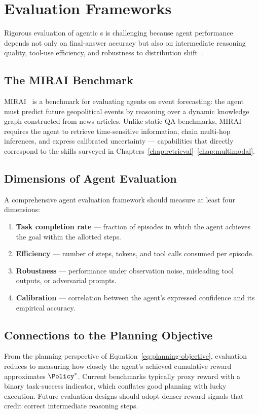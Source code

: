 \chapter{Evaluation Frameworks}
\label{chap:evaluation}

Rigorous evaluation of agentic \LLM{}s is challenging because agent
performance depends not only on final-answer accuracy but also on
intermediate reasoning quality, tool-use efficiency, and robustness to
distribution shift~\cite{ye2024mirai}.

\section{The MIRAI Benchmark}
\label{sec:eval-mirai}

MIRAI~\cite{ye2024mirai} is a benchmark for evaluating \LLM{} agents on
event forecasting: the agent must predict future geopolitical events by
reasoning over a dynamic knowledge graph constructed from news articles.
Unlike static QA benchmarks, MIRAI requires the agent to retrieve
time-sensitive information, chain multi-hop inferences, and express
calibrated uncertainty — capabilities that directly correspond to the
skills surveyed in Chapters~\ref{chap:retrieval}--\ref{chap:multimodal}.

\section{Dimensions of Agent Evaluation}
\label{sec:eval-dimensions}

A comprehensive agent evaluation framework should measure at least four
dimensions:

\begin{enumerate}
  \item \textbf{Task completion rate} — fraction of episodes in which the
        agent achieves the goal within the allotted steps.
  \item \textbf{Efficiency} — number of steps, tokens, and tool calls
        consumed per episode.
  \item \textbf{Robustness} — performance under observation noise,
        misleading tool outputs, or adversarial prompts.
  \item \textbf{Calibration} — correlation between the agent's expressed
        confidence and its empirical accuracy.
\end{enumerate}

\section{Connections to the Planning Objective}
\label{sec:eval-planning}

From the planning perspective of Equation~\eqref{eq:planning-objective},
evaluation reduces to measuring how closely the agent's achieved cumulative
reward approximates $\Policy^{*}$.
Current benchmarks typically proxy reward with a binary task-success
indicator, which conflates good planning with lucky execution.
Future evaluation designs should adopt denser reward signals that credit
correct intermediate reasoning steps.

